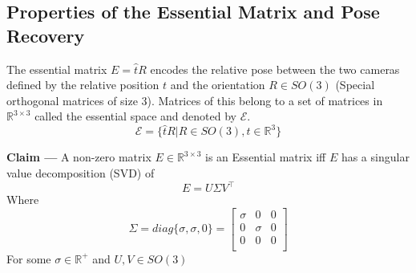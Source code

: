 \documentclass{article}
\begin{document}
\subsection{Properties of the Essential Matrix and Pose Recovery}
The essential matrix $E = \hat{t}R$ encodes the relative pose between the two cameras defined by the relative position $t$ and the orientation $R \in SO(3)$ (Special orthogonal matrices of size 3). Matrices of this belong to a set of matrices in $\mathbb{R}^{3\times 3}$ called the essential space and denoted by $\mathcal{E}$.
$$\mathcal{E} = \{\hat{t}R | R \in SO(3), t\in\mathbb{R}^3\}$$
\begin{tcolorbox}[enhanced,breakable, sharp corners, colback=green!5!white, colframe=green!55!black, boxrule=0mm,top=0mm,bottom=0mm,leftrule=1mm]
    {\color{green!55!black} \textbf{Claim ---}} 
    A non-zero matrix $E \in \mathbb{R}^{3\times 3}$ is an Essential matrix iff $E$ has a singular value decomposition (SVD) of
$$E = U\Sigma V^\top$$
Where
$$\Sigma = diag\{\sigma, \sigma, 0\} = 
\begin{bmatrix}
    \sigma &    0    &  0\\
      0    &  \sigma &  0 \\
      0    &    0    &  0 \\
\end{bmatrix}$$
For some $\sigma \in \mathbb{R}^+$ and $U, V \in SO(3)$
\end{tcolorbox}
\end{document}
